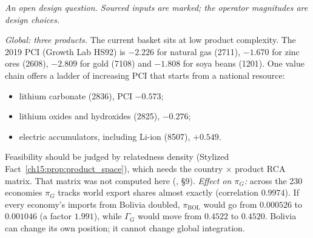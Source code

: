 \documentclass[../solutions_manual.tex]{subfiles}
\begin{document}

\emph{An open design question. Sourced inputs are marked; the operator magnitudes are design choices.}

 \emph{Global: three products.} The current basket sits at low product complexity. The 2019 PCI (Growth Lab HS92) is $-2.226$ for natural gas (2711), $-1.670$ for zinc ores (2608), $-2.809$ for gold (7108) and $-1.808$ for soya beans (1201). One value chain offers a ladder of increasing PCI that starts from a national resource:
\begin{itemize}
\item lithium carbonate (2836), PCI $-0.573$;
\item lithium oxides and hydroxides (2825), $-0.276$;
\item electric accumulators, including Li-ion (8507), $+0.549$.
\end{itemize}
Feasibility should be judged by relatedness density (Stylized Fact~\ref{ch15:prop:product_space}), which needs the country $\times$ product RCA matrix. That matrix was not computed here (, \S9). \emph{Effect on $\pi_G$:} across the 230 economies $\pi_G$ tracks world export shares almost exactly (correlation $0.9974$). If every economy's imports from Bolivia doubled, $\pi_{\text{BOL}}$ would go from $0.000526$ to $0.001046$ (a factor $1.991$), while $\Gamma_G$ would move from $0.4522$ to $0.4520$. Bolivia can change its own position; it cannot change global integration.
\end{document}

